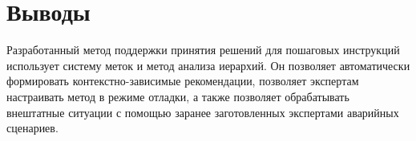 
\section*{Выводы}

Разработанный метод поддержки принятия решений для пошаговых инструкций использует систему меток и метод анализа иерархий. 
Он позволяет автоматически формировать контекстно-зависимые рекомендации, позволяет экспертам настраивать метод в режиме отладки, а также позволяет обрабатывать внештатные ситуации с помощью заранее заготовленных экспертами аварийных сценариев. 